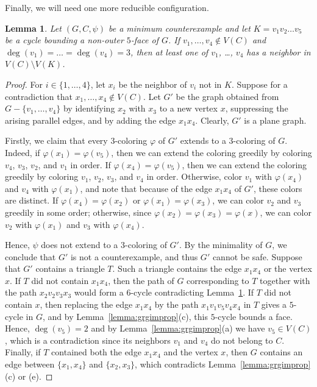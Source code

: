 \documentclass[12pt,twoside,openright,a4paper]{book}
\newtheorem{lemma}[theorem]{Lemma}
\begin{document}
Finally, we will need one more reducible configuration.
\begin{lemma}\label{lemma:grgim-redu}
Let $(G,C,\psi)$ be a minimum counterexample and let $K=v_1v_2\ldots v_5$ be a cycle bounding a non-outer $5$-face of $G$.
If $v_1,\ldots,v_4\not\in V(C)$ and $\deg(v_1)=\ldots=\deg(v_4)=3$, then at least one of $v_1$, \ldots, $v_4$ has a neighbor
in $V(C)\setminus V(K)$.
\end{lemma}
\begin{proof}
For $i\in\{1,\ldots,4\}$, let $x_i$ be the neighbor of $v_i$ not in $K$.  Suppose for a contradiction that $x_1,\ldots, x_4\not\in V(C)$.
Let $G'$ be the graph obtained from $G-\{v_1,\ldots,v_4\}$ by identifying $x_2$ with $x_3$ to a new vertex $x$, suppressing
the arising parallel edges, and by adding the edge $x_1x_4$.  Clearly, $G'$ is a plane graph.

Firstly, we claim that every $3$-coloring $\varphi$ of $G'$ extends to a $3$-coloring of $G$.
Indeed, if $\varphi(x_1)=\varphi(v_5)$, then we can extend the coloring greedily by coloring $v_4$, $v_3$, $v_2$, and $v_1$
in order.  If $\varphi(x_4)=\varphi(v_5)$, then we can extend the coloring greedily by coloring $v_1$, $v_2$, $v_3$, and $v_4$
in order.   Otherwise, color $v_1$ with $\varphi(x_4)$ and $v_4$ with $\varphi(x_1)$, and note that because of the edge $x_1x_4$
of $G'$, these colors are distinct.  If $\varphi(x_4)=\varphi(x_2)$ or $\varphi(x_1)=\varphi(x_3)$, we can color $v_2$ and $v_3$
greedily in some order; otherwise, since $\varphi(x_2)=\varphi(x_3)=\varphi(x)$, we can color $v_2$ with $\varphi(x_1)$
and $v_3$ with $\varphi(x_4)$.

Hence, $\psi$ does not extend to a $3$-coloring of $G'$.  By the minimality of $G$, we conclude that $G'$ is not a counterexample,
and thus $G'$ cannot be safe.  Suppose that $G'$ contains a triangle $T$.  Such a triangle contains the edge $x_1x_4$ or the vertex
$x$.  If $T$ did not contain $x_1x_4$, then the path of $G$ corresponding to $T$ together with the path $x_2v_2v_3x_3$
would form a $6$-cycle contradicting Lemma~\ref{lemma:grgim-redu}.  If $T$ did not contain $x$, then replacing the edge
$x_1x_4$ by the path $x_1v_1v_5v_4x_4$ in $T$ gives a $5$-cycle in $G$, and by Lemma~\ref{lemma:grgimprop}(c), this $5$-cycle
bounds a face.  Hence, $\deg(v_5)=2$ and by Lemma~\ref{lemma:grgimprop}(a) we have $v_5\in V(C)$, which is a contradiction
since its neighbors $v_1$ and $v_4$ do not belong to $C$.  Finally, if $T$ contained both the edge $x_1x_4$ and the vertex $x$,
then $G$ contains an edge between $\{x_1,x_4\}$ and $\{x_2,x_3\}$, which contradicts Lemma~\ref{lemma:grgimprop}(c) or (e).


\end{proof}
\end{document}
